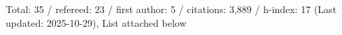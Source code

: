 Total: 35 / refereed: 23 / first author: 5 / citations: 3,889 / h-index: 17 (Last updated: 2025-10-29), List attached below